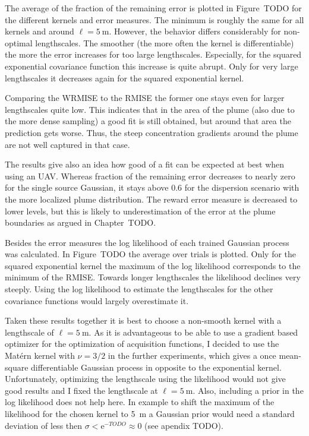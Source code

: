 \documentclass[11pt,a4paper,twoside,BCOR=15mm]{scrreprt}
\newcommand{\e}{\mathrm{e}}
\begin{document}
The average of the fraction of the remaining error is plotted in Figure~TODO for 
the different kernels and error measures. The minimum is roughly the same for 
all kernels and around $\ell = \SI{5}{\meter}$.  However, the behavior differs 
considerably for non-optimal lengthscales. The smoother (the more often the 
kernel is differentiable) the more the error increases for too large 
lengthscales. Especially, for the squared exponential covariance function this 
increase is quite abrupt. Only for very large lengthscales it decreases again 
for the squared exponential kernel.

Comparing the WRMISE to the RMISE the former one stays even for larger 
lengthscales quite low. This indicates that in the area of the plume (also due 
to the more dense sampling) a good fit is still obtained, but around that area 
the prediction gets worse. Thus, the steep concentration gradients around the 
plume are not well captured in that case.

The results give also an idea how good of a fit can be expected at best when 
using an UAV\@. Whereas fraction of the remaining error decreases to nearly zero 
for the single source Gaussian, it stays above 0.6 for the dispersion scenario 
with the more localized plume distribution. The reward error measure is 
decreased to lower levels, but this is likely to underestimation of the error at 
the plume boundaries as argued in Chapter~TODO\@.

Besides the error measures the log likelihood of each trained Gaussian process 
was calculated. In Figure~TODO the average over trials is plotted. Only for the 
squared exponential kernel the maximum of the log likelihood corresponds to the 
minimum of the RMISE\@. Towards longer lengthscales the likelihood declines very 
steeply. Using the log likelihood to estimate the lengthscales for the other 
covariance functions would largely overestimate it.

Taken these results together it is best to choose a non-smooth kernel with 
a lengthscale of $\ell = \SI{5}{\meter}$. As it is advantageous to be able to 
use a gradient based optimizer for the optimization of acquisition functions, 
I decided to use the Matérn kernel with $\nu = 3/2$ in the further experiments, 
which gives a once mean-square differentiable Gaussian process in opposite to 
the exponential kernel. Unfortunately, optimizing the lengthscale using the 
likelihood would not give good results and I fixed the lengthscale at $\ell 
= \SI{5}{\meter}$. Also, including a prior in the log likelihood does not help 
here. In example to shift the maximum of the likelihood for the chosen kernel to 
\SI{5}{\meter} a Gaussian prior would need a standard deviation of less then 
$\sigma < \e^{-TODO} \approx 0$ (see apendix TODO).
\end{document}
